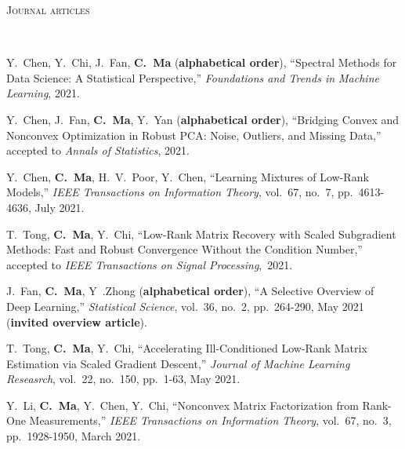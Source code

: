 \documentclass[a4paper, 10pt]{article}
\newenvironment{changemargin}[2]{%
  \begin{list}{}{%
    \setlength{\topsep}{0pt}%
    \setlength{\leftmargin}{#1}%
    \setlength{\rightmargin}{#2}%
    \setlength{\listparindent}{\parindent}%
    \setlength{\itemindent}{\parindent}%
    \setlength{\parsep}{\parskip}%
  }%
  \item[]}{\end{list}
}
\newcommand{\lineover}{
	\begin{changemargin}{-0.05in}{-0.05in}
		\vspace*{-8pt}
		\hrulefill \\
		\vspace*{-2pt}
	\end{changemargin}
}
\newcommand{\header}[1]{
	\begin{changemargin}{-0.5in}{-0.5in}
		\scshape{#1}\\
  	\lineover
	\end{changemargin}
}
\newenvironment{body} {
	\vspace*{-16pt}
	\begin{changemargin}{-0.3in}{-0.5in}
  }	
	{\end{changemargin}
}
\begin{document}
\bigskip
\header{\LARGE{Journal articles}}
\begin{body}
\vspace{18pt}
\begin{enumerate}[label={[{J}{{\arabic*}}]}]

\item Y.~Chen, Y.~Chi, J.~Fan, \textbf{C.~Ma} (\textbf{alphabetical order}), {``Spectral Methods for Data Science: A Statistical Perspective,''}  \emph{Foundations and Trends in Machine Learning}, 2021. \\

\item Y.~Chen, J.~Fan, \textbf{C.~Ma}, Y.~Yan (\textbf{alphabetical order}), {``Bridging Convex and Nonconvex Optimization in Robust PCA: Noise, Outliers, and Missing Data,''}  accepted to \emph{Annals of Statistics}, 2021. \\

\item Y.~Chen, \textbf{C.~Ma}, H.~V.~Poor, Y.~Chen, {``Learning Mixtures of Low-Rank Models,''} \emph{IEEE Transactions on Information Theory}, vol.~67, no.~7, pp.~4613-4636, July 2021. \\






\item T.~Tong, \textbf{C.~Ma}, Y.~Chi, {``Low-Rank Matrix Recovery with Scaled Subgradient Methods: Fast and Robust Convergence Without the Condition Number,''}  accepted to \emph{IEEE Transactions on Signal Processing},~2021. \\







\item J.~Fan, \textbf{C.~Ma}, Y~.Zhong (\textbf{alphabetical order}), {``A Selective Overview of Deep Learning,''} \emph{Statistical Science}, vol.~36, no.~2, pp.~264-290, May 2021 (\textbf{invited overview article}).\\

\item T.~Tong, \textbf{C.~Ma}, Y.~Chi, {``Accelerating Ill-Conditioned Low-Rank Matrix Estimation via Scaled Gradient Descent,''} \emph{Journal of Machine Learning Reseasrch}, vol.~22, no.~150, pp.~1-63, May 2021. \\

\item Y.~Li, \textbf{C.~Ma}, Y.~Chen, Y.~Chi, {``Nonconvex Matrix Factorization from Rank-One Measurements,''} \emph{IEEE Transactions on Information Theory}, vol.~67, no.~3, pp.~1928-1950, March 2021.


\end{enumerate}
\end{body}
\end{document}
